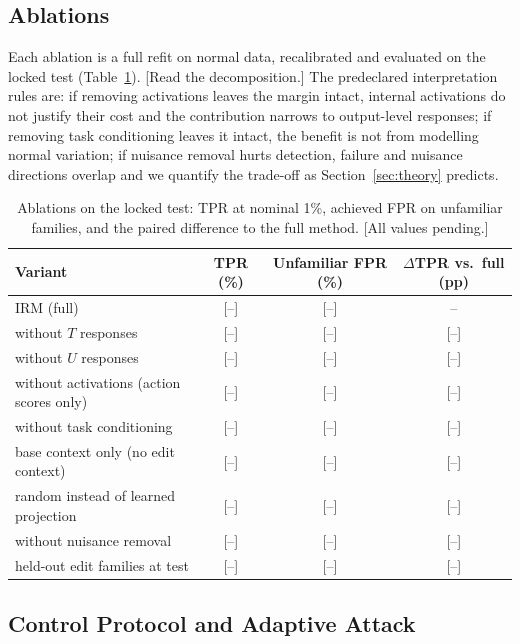 \documentclass[10pt]{article}
\newcommand{\TBD}[1]{\textcolor{BrickRed}{[#1]}}
\newcommand{\method}{\textsc{IRM}}
\begin{document}
\subsection{Ablations}
\label{sec:ablations}

Each ablation is a full refit on normal data, recalibrated and evaluated on the locked test
(Table~\ref{tab:ablation}). \TBD{Read the decomposition.} The predeclared interpretation rules are:
if removing activations leaves the margin intact, internal activations do not justify their cost and
the contribution narrows to output-level responses; if removing task conditioning leaves it intact,
the benefit is not from modelling normal variation; if nuisance removal hurts detection, failure and
nuisance directions overlap and we quantify the trade-off as Section~\ref{sec:theory} predicts.

\begin{table}[t]
\caption{Ablations on the locked test: TPR at nominal 1\%, achieved FPR on unfamiliar families, and the
paired difference to the full method. \TBD{All values pending.}}
\label{tab:ablation}
\centering\small
\begin{tabular}{lccc}
\toprule
Variant & TPR (\%) & Unfamiliar FPR (\%) & $\Delta$TPR vs.\ full (pp) \\
\midrule
\method{} (full) & \TBD{--} & \TBD{--} & -- \\
\quad without $T$ responses & \TBD{--} & \TBD{--} & \TBD{--} \\
\quad without $U$ responses & \TBD{--} & \TBD{--} & \TBD{--} \\
\quad without activations (action scores only) & \TBD{--} & \TBD{--} & \TBD{--} \\
\quad without task conditioning & \TBD{--} & \TBD{--} & \TBD{--} \\
\quad base context only (no edit context) & \TBD{--} & \TBD{--} & \TBD{--} \\
\quad random instead of learned projection & \TBD{--} & \TBD{--} & \TBD{--} \\
\quad without nuisance removal & \TBD{--} & \TBD{--} & \TBD{--} \\
\quad held-out edit families at test & \TBD{--} & \TBD{--} & \TBD{--} \\
\bottomrule
\end{tabular}
\end{table}

\subsection{Control Protocol and Adaptive Attack}
\label{sec:attack}
\end{document}
